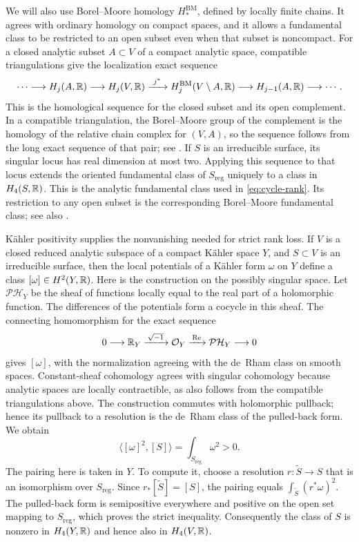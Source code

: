 We will also use Borel--Moore homology $H_*^{\mathrm{BM}}$, defined by
locally finite chains.  It agrees with ordinary homology on compact
spaces, and it allows a fundamental class to be restricted to an open
subset even when that subset is noncompact.  For a closed analytic
subset $A\subset V$ of a compact analytic space, compatible
triangulations give the localization exact sequence
\begin{equation}\label{eq:bm-localization}
 \cdots\longrightarrow H_j(A,\mathbb R)\longrightarrow H_j(V,\mathbb R)
 \xrightarrow{\ j^*\ } H_j^{\mathrm{BM}}(V\setminus A,\mathbb R)
 \longrightarrow H_{j-1}(A,\mathbb R)\longrightarrow\cdots.
\end{equation}
This is the homological sequence for the closed subset and its open
complement.  In a compatible triangulation, the Borel--Moore group of
the complement is the homology of the relative chain complex for
$(V,A)$, so the sequence follows from the long exact sequence of that
pair; see
\cite[Sections~1.2 and~1.6]{BorelHaefliger1961}.
If $S$ is an irreducible surface, its singular
locus has real dimension at most two.  Applying this sequence to that
locus extends the oriented fundamental class of $S_{\mathrm{reg}}$
uniquely to a class in $H_4(S,\mathbb R)$.  This is the analytic fundamental
class used in \eqref{eq:cycle-rank}.  Its restriction to any open subset
is the corresponding Borel--Moore fundamental class; see also
\cite[Section~3.1 and Theorem~3.2]{BorelHaefliger1961}.

K\"ahler positivity supplies the nonvanishing needed for strict rank
loss.  If $V$ is a closed reduced analytic subspace of a compact
K\"ahler space $Y$, and $S\subset V$ is an irreducible surface, then
the local potentials of a K\"ahler form $\omega$ on $Y$ define a class
$[\omega]\in H^2(Y,\mathbb R)$.  Here is the construction on the possibly
singular space.  Let $\mathcal{PH}_Y$ be the sheaf of functions locally
equal to the real part of a holomorphic function.  The differences of
the potentials form a cocycle in this sheaf.  The connecting
homomorphism for the exact sequence
\[
 0\longrightarrow\mathbb R_Y\xrightarrow{\,\sqrt{-1}\,}\mathcal O_Y
   \xrightarrow{\,\operatorname{Re}\,}\mathcal{PH}_Y
   \longrightarrow0
\]
gives $[\omega]$, with the normalization agreeing with the de~Rham
class on smooth spaces.  Constant-sheaf cohomology agrees with
singular cohomology because analytic spaces are locally contractible,
as also follows from the compatible triangulations above.  The
construction commutes with holomorphic pullback; hence its pullback
to a resolution is the de~Rham class of the pulled-back form.  We obtain
\begin{equation}\label{eq:positive-surface-class}
 \bigl\langle[\omega]^2,[S]\bigr\rangle
   =\int_{S_{\mathrm{reg}}}\omega^2>0.
\end{equation}
The pairing here is taken in $Y$.  To compute it, choose a resolution
$r:\widetilde S\to S$ that is an isomorphism over $S_{\mathrm{reg}}$.
Since $r_*[\widetilde S]=[S]$, the pairing equals
$\int_{\widetilde S}(r^*\omega)^2$.  The pulled-back form is
semipositive everywhere and positive on the open set mapping to
$S_{\mathrm{reg}}$, which proves the strict inequality.  Consequently
the class of $S$ is nonzero in $H_4(Y,\mathbb R)$ and hence also in
$H_4(V,\mathbb R)$.

